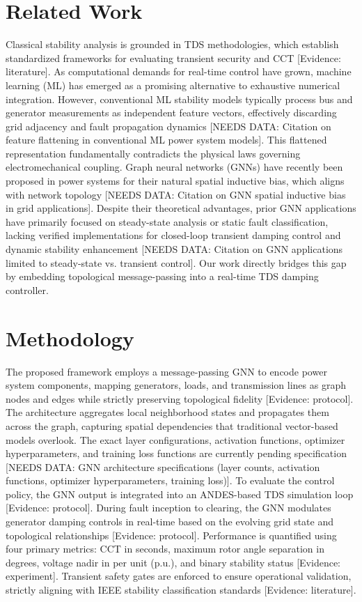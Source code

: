 \documentclass[11pt,a4paper]{article}
\begin{document}
\section{Related Work}
Classical stability analysis is grounded in TDS methodologies, which establish standardized frameworks for evaluating transient security and CCT [Evidence: literature]. As computational demands for real-time control have grown, machine learning (ML) has emerged as a promising alternative to exhaustive numerical integration. However, conventional ML stability models typically process bus and generator measurements as independent feature vectors, effectively discarding grid adjacency and fault propagation dynamics [NEEDS DATA: Citation on feature flattening in conventional ML power system models]. This flattened representation fundamentally contradicts the physical laws governing electromechanical coupling. Graph neural networks (GNNs) have recently been proposed in power systems for their natural spatial inductive bias, which aligns with network topology [NEEDS DATA: Citation on GNN spatial inductive bias in grid applications]. Despite their theoretical advantages, prior GNN applications have primarily focused on steady-state analysis or static fault classification, lacking verified implementations for closed-loop transient damping control and dynamic stability enhancement [NEEDS DATA: Citation on GNN applications limited to steady-state vs. transient control]. Our work directly bridges this gap by embedding topological message-passing into a real-time TDS damping controller.

\section{Methodology}
The proposed framework employs a message-passing GNN to encode power system components, mapping generators, loads, and transmission lines as graph nodes and edges while strictly preserving topological fidelity [Evidence: protocol]. The architecture aggregates local neighborhood states and propagates them across the graph, capturing spatial dependencies that traditional vector-based models overlook. The exact layer configurations, activation functions, optimizer hyperparameters, and training loss functions are currently pending specification [NEEDS DATA: GNN architecture specifications (layer counts, activation functions, optimizer hyperparameters, training loss)]. To evaluate the control policy, the GNN output is integrated into an ANDES-based TDS simulation loop [Evidence: protocol]. During fault inception to clearing, the GNN modulates generator damping controls in real-time based on the evolving grid state and topological relationships [Evidence: protocol]. Performance is quantified using four primary metrics: CCT in seconds, maximum rotor angle separation in degrees, voltage nadir in per unit (p.u.), and binary stability status [Evidence: experiment]. Transient safety gates are enforced to ensure operational validation, strictly aligning with IEEE stability classification standards [Evidence: literature].
\end{document}
